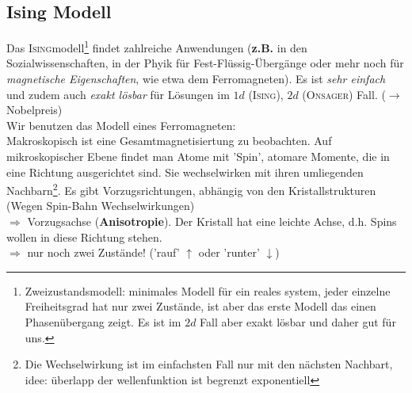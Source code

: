 \documentclass[12pt]{article}
\begin{document}
 \subsection{Ising Modell}
 Das \textsc{Ising}modell\footnote{Zweizustandsmodell: minimales Modell für ein reales system, jeder einzelne Freiheitsgrad hat nur zwei Zustände, ist aber das erste Modell das einen Phasenübergang zeigt. Es ist im $2d$ Fall aber exakt lösbar und daher gut für uns.} findet zahlreiche Anwendungen (\textbf{z.B.} in den Sozialwissenschaften, in der Phyik für Fest-Flüssig-Übergänge oder mehr noch für \textit{magnetische Eigenschaften}, wie etwa dem Ferromagneten). Es ist \textit{sehr einfach} und zudem auch \textit{exakt lösbar} für Lösungen im $1d$ (\textsc{Ising}), $2d $ (\textsc{Onsager}) Fall.
($\to$ Nobelpreis) \\
Wir benutzen das Modell eines Ferromagneten:  \\
Makroskopisch ist eine Gesamtmagnetisiertung zu beobachten. Auf mikroskopischer Ebene findet man Atome mit 'Spin', atomare Momente, die in eine Richtung ausgerichtet sind. Sie wechselwirken mit ihren umliegenden Nachbarn\footnote{ Die Wechselwirkung ist im einfachsten Fall nur mit den nächsten Nachbart, idee: überlapp der wellenfunktion ist begrenzt exponentiell}. Es gibt Vorzugsrichtungen, abhängig von den Kristallstrukturen (Wegen Spin-Bahn Wechselwirkungen) \\
$\Rightarrow$ Vorzugsachse (\textbf{Anisotropie}). Der Kristall hat eine leichte Achse, d.h. Spins wollen in diese Richtung stehen.\\
$\Rightarrow$ nur noch zwei Zustände! ('rauf' $\uparrow$ oder 'runter' $\downarrow$) \\

\end{document}

